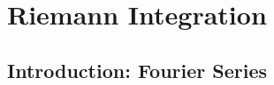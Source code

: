 \documentclass[
]{article}
\author{}
\date{}
\begin{document}
\newcommand{\ba}{\begin{aligned}}
\newcommand{\ea}{\end{aligned}}
\newcommand{\bm}{\begin{bmatrix}}
\newcommand{\em}{\end{bmatrix}}
\newcommand{\bc}{\begin{cases}}
\newcommand{\ec}{\end{cases}}
\newcommand{\empty}{\varnothing}
\newcommand{\se}{\subseteq}
\newcommand{\ve}{\varepsilon}
\newcommand{\s}{\sigma}
\newcommand{\0}{\textbf 0}
\newcommand{\1}{\textbf 1}
\newcommand{\I}{\textbf I}
\newcommand{\X}{\textbf X}
\newcommand{\x}{\textbf x}
\newcommand{\y}{\textbf y}
\newcommand{\b}{\textbf b}
\newcommand{\w}{\textbf w}
\newcommand{\P}{\mathcal P}
\newcommand{\S}{\mathcal S}
\newcommand{\T}{\mathcal T}
\newcommand{\A}{\mathcal A}
\newcommand{\B}{\mathcal B}
\newcommand{\C}{\mathcal C}
\newcommand{\L}{\mathcal L}
\newcommand{\c}{\backslash}
\newcommand{\if}{\text{ if }}
\newcommand{\uinf}[1][k]{\bigcup_{{#1} = 1}^{\infty}}
\newcommand{\sinf}[1][k]{\sum_{{#1} = 1}^{\infty}}
\newcommand{\iinf}[1][k]{\bigcap_{{#1} = 1}^{\infty}}
\newcommand{\plim}{\text{plim }}
\newcommand{\too}{\Longrightarrow}
\newcommand{\sq}{\sqrt}
\newcommand{\dev}[2][i]{({#2}_{#1}-\bar{#2})}
\newcommand{\inv}[1]{{#1}^{-1}}
\newcommand{\add}[1][i]{\sum_{#1 = 1}^n}
\newcommand{\ply}[1][i]{\prod_{#1 = 1}^n}
\newcommand{\br}[1]{\left[#1\right]}
\newcommand{\pr}[1]{\left(#1\right)}
\newcommand{\brace}[1]{\left\{#1\right\}}
\newcommand{\norm}[2][1]{\|{#2}\|_{#1}}
\newcommand{\seq}[1][x]{{#1}_1,{#1}_2,\cdots,{#1}_{n}}
\newcommand{\seqadd}[1][x]{{#1}_1+{#1}_2+\cdots+{#1}_{n}}
\newcommand{\dto}{\overset{\text d}{\to}}
\newcommand{\asim}{\overset{\text a}{\sim}}
\newcommand{\st}{\text{ s.t. }}
\newcommand{\om}[1]{\mu^*\pr{#1}}
\newcommand{\lm}[1]{\mu\pr{#1}}
\newcommand{\d}{\text{ d}}
\newcommand{\dm}{\text{ d}\mu}
\newcommand{\dl}{\text{ d}\lambda}
\newcommand{\abs}[1]{\left|{#1}\right|}

\hypertarget{riemann-integration}{%
\section{Riemann Integration}\label{riemann-integration}}

\hypertarget{introduction-fourier-series}{%
\subsection{Introduction: Fourier
Series}\label{introduction-fourier-series}}
\end{document}
